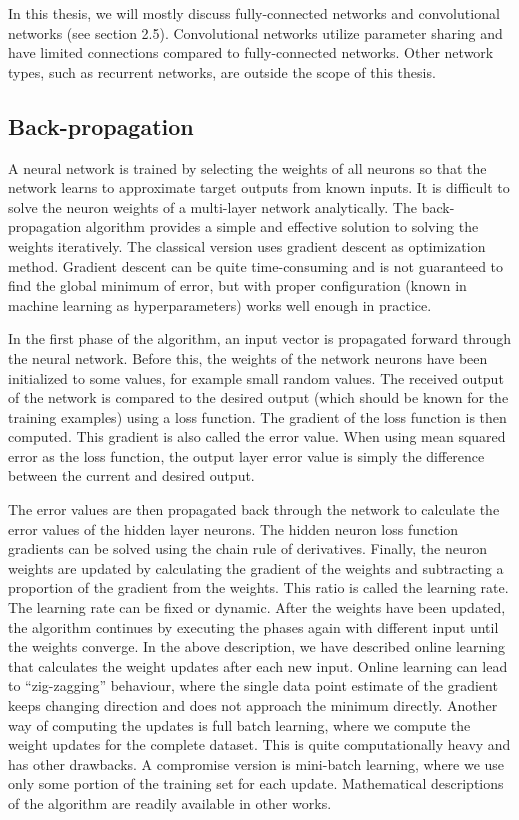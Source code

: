 In this thesis, we will mostly discuss fully-connected networks and convolutional networks (see section 2.5). Convolutional networks utilize parameter sharing and have limited connections compared to fully-connected networks. Other network types, such as recurrent networks, are outside the scope of this thesis.

\subsection{Back-propagation}
A neural network is trained by selecting the weights of all neurons so that the network learns to approximate target outputs from known inputs. It is difficult to solve the neuron weights of a multi-layer network analytically. The back-propagation algorithm provides a simple and effective solution to solving the weights iteratively. The classical version uses gradient descent as optimization method. Gradient descent can be quite time-consuming and is not guaranteed to find the global minimum of error, but with proper configuration (known in machine learning as hyperparameters) works well enough in practice. 

In the first phase of the algorithm, an input vector is propagated forward through the neural network. Before this, the weights of the network neurons have been initialized to some values, for example small random values. The received output of the network is compared to the desired output (which should be known for the training examples) using a loss function. The gradient of the loss function is then computed. This gradient is also called the error value. When using mean squared error as the loss function, the output layer error value is simply the difference between the current and desired output. 

The error values are then propagated back through the network to calculate the error values of the hidden layer neurons. The hidden neuron loss function gradients can be solved using the chain rule of derivatives. Finally, the neuron weights are updated by calculating the gradient of the weights and subtracting a proportion of the gradient from the weights. This ratio is called the learning rate. The learning rate can be fixed or dynamic. After the weights have been updated, the algorithm continues by executing the phases again with different input until the weights converge. In the above description, we have described online learning that calculates the weight updates after each new input. Online learning can lead to “zig-zagging” behaviour, where the single data point estimate of the gradient keeps changing direction and does not approach the minimum directly. Another way of computing the updates is full batch learning, where we compute the weight updates for the complete dataset. This is quite computationally heavy and has other drawbacks. A compromise version is mini-batch learning, where we use only some portion of the training set for each update. Mathematical descriptions of the algorithm are readily available in other works.


